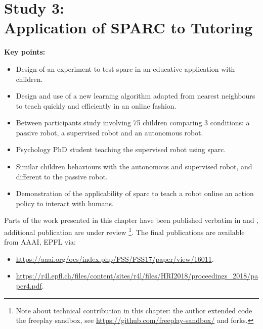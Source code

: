 \chapter[Study 3: Application of SPARC to Tutoring]{Study 3: \\Application of SPARC to Tutoring}\label{chap:tutoring}
\glsresetall
\graphicspath{{images/tutoring/}}

\begin{framed}
	\textbf{Key points:}
	
	\begin{itemize}
		\item Design of an experiment to test \acrshort{sparc} in an educative application with children.
		\item Design and use of a new learning algorithm adapted from nearest neighbours to teach quickly and efficiently in an online fashion.
		\item Between participants study involving 75 children comparing 3 conditions: a passive robot, a supervised robot and an autonomous robot.
		\item Psychology PhD student teaching the supervised robot using \acrshort{sparc}.
		\item Similar children behaviours with the autonomous and supervised robot, and different to the passive robot.
		\item Demonstration of the applicability of \acrshort{sparc} to teach a robot online an action policy to interact with humans.
	\end{itemize}
\end{framed}

Parts of the work presented in this chapter have been published verbatim in \cite{senft2017toward} and \cite{senft2018robots}, additional publication are under review \footnote{Note about technical contribution in this chapter: the author extended code the freeplay sandbox, see \url{https://github.com/freeplay-sandbox/} and forks.}. The final publications are available from AAAI, EPFL via:
\begin{itemize}
	\item \url{https://aaai.org/ocs/index.php/FSS/FSS17/paper/view/16011}.
	\item \url{https://r4l.epfl.ch/files/content/sites/r4l/files/HRI2018/proceedings_2018/paper4.pdf}.
\end{itemize} 

\newpage

